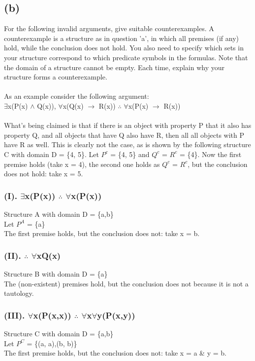 \documentclass[a4paper]{article}
\begin{document}
\newpage
\subsection{(b)}
For the following invalid arguments, give suitable counterexamples. A counterexample is a structure
as in question 'a', in which all premises (if any) hold, while the conclusion does not hold. You also
need to specify which sets in your structure correspond to which predicate symbols in the formulas.
Note that the domain of a structure cannot be empty. Each time, explain why your structure forms
a counterexample.
\\\\
As an example consider the following argument:\\
$\exists $x(P(x) $\wedge $ Q(x)), $\forall $x(Q(x) $\rightarrow $ R(x)) $\therefore $ $\forall $x(P(x) $\rightarrow $ R(x))
\\\\
What's being claimed is that if there is an object with property P that it also has property Q, and
all objects that have Q also have R, then all all objects with P have R as well. This is clearly not
the case, as is shown by the following structure C with domain D = \{4, 5\}. Let $P^c$ = \{4, 5\} and
$Q^c$ = $R^c$ = \{4\}. Now the first premise holds (take x = 4), the second one holds as $Q^c$ = $R^c$, but
the conclusion does not hold: take x = 5.\\
\subsubsection{(I). $\exists $x(P(x)) $\therefore $ $\forall $x(P(x))}
Structure A with domain D = \{a,b\}\\
Let $P^A$ = \{a\}\\
The first premise holds, but the conclusion does not: take x = b.
\subsubsection{(II). $\therefore $ $\forall $xQ(x)}
Structure B with domain D = \{a\}\\
The (non-existent) premises hold, but the conclusion does not because it is not a tautology.

\subsubsection{(III). $\forall $x(P(x,x)) $\therefore $ $\forall $x$\forall $y(P(x,y))}
Structure C with domain D = \{a,b\}\\
Let $P^C$ = \{(a, a),(b, b)\}\\
The first premise holds, but the conclusion does not: take x = a \& y = b.
\end{document}
